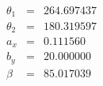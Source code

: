 \begin{eqnarray}
\theta_1 &=& 264.697437 \\ 
\theta_2 &=& 180.319597 \\ 
a_x &=& 0.111560 \\ 
b_y &=& 20.000000 \\ 
\beta &=& 85.017039 
\end{eqnarray}
